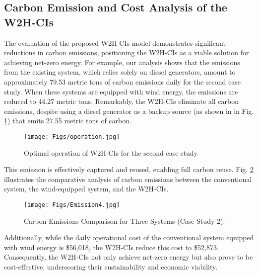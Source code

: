 \documentclass[conference]{IEEEtran}
\begin{document}
\subsection{Carbon Emission and Cost Analysis of the W2H-CIs}
The evaluation of the proposed W2H-CIs model demonstrates significant reductions in carbon emissions, positioning the W2H-CIs as a viable solution for achieving net-zero energy. For example, our analysis shows that the emissions from the existing system, which relies solely on diesel generators, amount to approximately 79.53 metric tons of carbon emissions daily for the second case study. When these systems are equipped with wind energy, the emissions are reduced to 44.27 metric tons. Remarkably, the W2H-CIs eliminate all carbon emissions, despite using a diesel generator as a backup source (as shown in in Fig. \ref{pic: operation}) that emits 27.55 metric tons of carbon. 
\begin{figure}[!t]  
  \centering
\texttt{[image: Figs/operation.jpg]}
 \centering
 \vspace{-.3cm}
    \caption{Optimal operation of W2H-CIs for the second case study}
  \label{pic: operation}   
      \vspace{-.3cm}
\end{figure} 
This emission is effectively captured and reused, enabling full carbon reuse. Fig. \ref{pic: Emission} illustrates the comparative analysis of carbon emissions between the conventional system, the wind-equipped system, and the W2H-CIs. 
\begin{figure}[!t]  
  \centering
\texttt{[image: Figs/Emission4.jpg]}
 \centering
 \vspace{-.3cm}
    \caption{Carbon Emissions Comparison for Three Systems (Case Study 2).}
  \label{pic: Emission}   
      \vspace{-.5cm}
\end{figure} 
Additionally, while the daily operational cost of the conventional system equipped with wind energy is \$56,018, the W2H-CIs reduce this cost to \$52,873. Consequently, the W2H-CIs not only achieve net-zero energy but also prove to be cost-effective, underscoring their sustainability and economic viability.  
\end{document}
